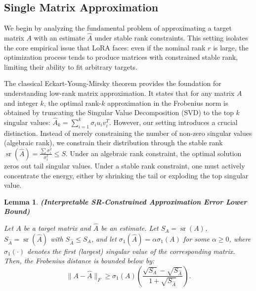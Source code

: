 \documentclass[a4paper,14pt]{extarticle}
\DeclareMathOperator{\sr}{sr}
\newtheorem{lemma}{Lemma}
\begin{document}
    \subsection{Single Matrix Approximation}
    
    We begin by analyzing the fundamental problem of approximating a target matrix $A$ with an estimate $\hat{A}$ under stable rank constraints. This setting isolates the core empirical issue that LoRA faces: even if the nominal rank $r$ is large, the optimization process tends to produce matrices with constrained stable rank, limiting their ability to fit arbitrary targets.
    
    The classical Eckart-Young-Mirsky theorem \cite{EckartYoung1936} provides the foundation for understanding low-rank matrix approximation. It states that for any matrix $A$ and integer $k$, the optimal rank-$k$ approximation in the Frobenius norm is obtained by truncating the Singular Value Decomposition (SVD) to the top $k$ singular values: $\hat{A}_k = \sum_{i=1}^k \sigma_i u_i v_i^T$. However, our setting introduces a crucial distinction. Instead of merely constraining the number of non-zero singular values (algebraic rank), we constrain their distribution through the stable rank $\sr(\hat{A}) = \frac{\sum \sigma_i^2}{\sigma_1^2} \leq S$. Under an algebraic rank constraint, the optimal solution zeros out tail singular values. Under a stable rank constraint, one must actively concentrate the energy, either by shrinking the tail or exploding the top singular value. \\

    \begin{lemma} \textbf{(Interpretable SR-Constrained Approximation Error Lower Bound)}

        Let $A$ be a target matrix and $\hat{A}$ be an estimate. Let $S_A = \sr(A)$, $S_{\hat{A}} = \sr(\hat{A})$ with $S_{\hat{A}} \leqslant S_A$, and let $\sigma_1(\hat{A}) = \alpha \sigma_1(A)$ for some $\alpha \geq 0$, where $\sigma_1(\cdot)$ denotes the first (largest) singular value of the corresponding matrix. Then, the Frobenius distance is bounded below by:
        \[ 
        \|A - \hat{A}\|_F \geqslant \sigma_1(A)\left(\frac{\sqrt{S_A} - \sqrt{S_{\hat{A}}}}{1 + \sqrt{S_{\hat{A}}}}\right).
        \]
    \end{lemma}
\end{document}
